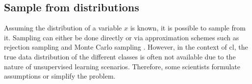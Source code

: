 
\subsection{Sample from distributions}
\label{subsec:SampleViaDistribution}

Assuming the distribution of a variable $x$ is known, it is possible to sample from it.
Sampling can either be done directly or 
via approximation schemes such as rejection sampling and Monte Carlo sampling \citet{robinson_contrastive_2021} .
However, in the context of \ac{cl}, the true data distribution of the different classes is often not available 
due to the nature of unsupervised learning scenarios.
Therefore, some scientists formulate assumptions or simplify the problem.








